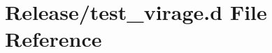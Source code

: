 \hypertarget{test__virage_8d}{}\section{Release/test\+\_\+virage.d File Reference}
\label{test__virage_8d}
